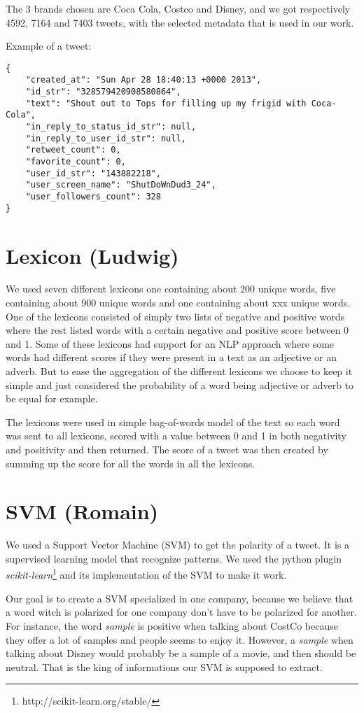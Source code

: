 \documentclass[a4paper,11pt]{report}
\begin{document}
The 3 brands chosen are Coca Cola, Costco and Disney, and we got respectively 4592, 7164 and 7403 tweets, with the selected metadata that is used in our work.

Example of a tweet:

\begin{verbatim}
{
    "created_at": "Sun Apr 28 18:40:13 +0000 2013",
    "id_str": "328579420908580864",
    "text": "Shout out to Tops for filling up my frigid with Coca-Cola",
    "in_reply_to_status_id_str": null,
    "in_reply_to_user_id_str": null, 
    "retweet_count": 0,
    "favorite_count": 0,
    "user_id_str": "143882218",
    "user_screen_name": "ShutDoWnDud3_24",
    "user_followers_count": 328
}
\end{verbatim}

\section{Lexicon (Ludwig)}
We used seven different lexicons one containing about 200 unique words, five containing about 900 unique words and one containing about xxx unique words.
One of the lexicons consisted of simply two lists of negative and positive words where the rest listed words with a certain negative and positive score between 0 and 1. 
Some of these lexicons had support for an NLP approach where some words had different scores if they were present in a text as an adjective or an adverb.  
But to ease the aggregation of the different lexicons we choose to keep it simple and just considered the probability of a word being adjective or adverb to be equal for example.

The lexicons were used in simple bag-of-words model of the text so each word was sent to all lexicons, scored with a value between 0 and 1 in both negativity and positivity and then returned. 
The score of a tweet was then created by summing up the score for all the words in all the lexicons. 

\section{SVM (Romain)}
We used a Support Vector Machine (SVM) to get the polarity of a tweet. It is a supervised learning model that recognize patterns. We used the python plugin \textit{scikit-learn}\footnote{http://scikit-learn.org/stable/} and its implementation of the SVM to make it work.

Our goal is to create a SVM specialized in one company, because we believe that a word witch is polarized for one company don't have to be polarized for another.
For instance, the word \textit{sample} is positive when talking about CostCo because they offer a lot of samples and people seems to enjoy it. However, a \textit{sample} when talking about Disney would probably be a sample of a movie, and then should be neutral.
That is the king of informations our SVM is supposed to extract.
\end{document}
